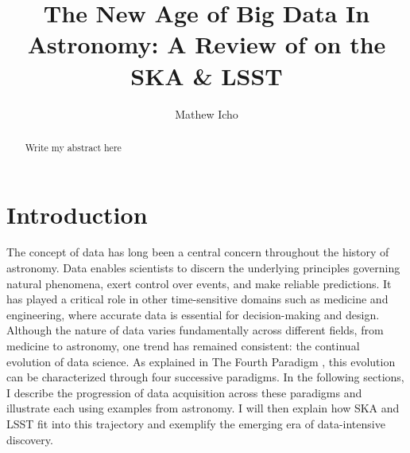 \documentclass[manuscript,linenumbers,longauthor]{aastex631}
\begin{document}
\title{The New Age of Big Data In Astronomy: A Review of on the SKA \& LSST}
\author{Mathew Icho}

\begin{abstract}
Write my abstract here
\end{abstract}

\tableofcontents

\section{Introduction}
The concept of data has long been a central concern throughout the history of astronomy. Data enables scientists to discern the underlying principles governing natural phenomena, exert control over events, and make reliable predictions. It has played a critical role in other time-sensitive domains such as medicine and engineering, where accurate data is essential for decision-making and design. Although the nature of data varies fundamentally across different fields, from medicine to astronomy, one trend has remained consistent: the continual evolution of data science. As explained in The Fourth Paradigm \citep{heyFourthParadigmDataIntensive2009}, this evolution can be characterized through four successive paradigms. In the following sections, I describe the progression of data acquisition across these paradigms and illustrate each using examples from astronomy. I will then explain how SKA and LSST fit into this trajectory and exemplify the emerging era of data-intensive discovery.
\end{document}
